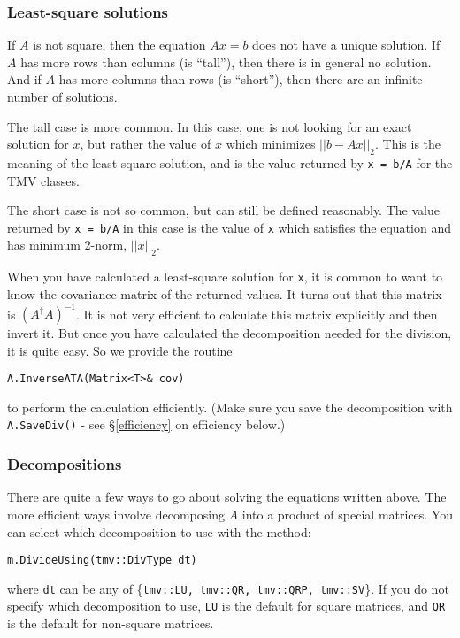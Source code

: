 \documentclass[twoside,letterpaper,11pt]{article}
\renewcommand{\tt}[1]{{\texttt {#1}}}
\begin{document}
\subsubsection{Least-square solutions}

If $A$ is not square, then the equation $A x = b$ does not have a unique solution.
If $A$ has more rows than columns (is ``tall''), then there is in general no solution.
And if $A$ has more columns than rows (is ``short''), then there are an infinite 
number of solutions.  

The tall case is more common.  In this case, one is not looking for an exact solution
for $x$, but rather the value of $x$ which minimizes $||b - A x||_2$.  This is the 
meaning of the least-square
solution, and is the value returned by \tt{x = b/A} for the TMV classes.

The short case is not so common, but can still be defined reasonably.  The
value returned by \tt{x = b/A} in this case is the value of \tt{x} which satisfies the 
equation and has minimum 2-norm, $||x||_2$.

When you have calculated a least-square solution for \tt{x}, it is common to want 
to know the covariance matrix of the returned values.  It turns out that this
matrix is $(A^\dagger A)^{-1}$.  It is not very efficient to calculate this matrix
explicitly and then invert it.  But once you have calculated the decomposition
needed for the division, it is quite easy.  So we provide the routine 
\begin{verbatim}
A.InverseATA(Matrix<T>& cov)
\end{verbatim}
to perform the calculation efficiently.  (Make sure you save the decomposition with 
\tt{A.SaveDiv()} - see \S\ref{efficiency} on efficiency below.)

\subsubsection{Decompositions}
\label{decompositions}

There are quite a few ways to go about solving the equations written above.  
The more efficient ways involve decomposing $A$ into a product of special 
matrices.  You can select which decomposition to use with the method:
\begin{verbatim}
m.DivideUsing(tmv::DivType dt)
\end{verbatim}
where \tt{dt} can be any of \{\tt{tmv::LU, tmv::QR, tmv::QRP, tmv::SV}\}.
If you do not specify which decomposition to use, \tt{LU} is the 
default for square matrices, and \tt{QR} is the default for
non-square matrices.
\end{document}
